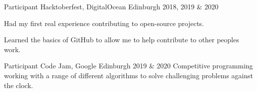 \begin{cventries}

  \cventry
    {Participant} %
    {Hacktoberfest, DigitalOcean} %
    {Edinburgh} %
    {2018, 2019 \& 2020} %
    {
      \begin{cvitems} %
        \item {Had my first real experience contributing to open-source projects.}
        \item {Learned the basics of GitHub to allow me to help contribute to other peoples work.}
      \end{cvitems}
    }
    

  \cventry
     {Participant}
     {Code Jam, Google}
     {Edinburgh}
     {2019 \& 2020}
     {
      Competitive programming working with a range of different algorithms to solve challenging problems against the clock.
     }



\end{cventries}